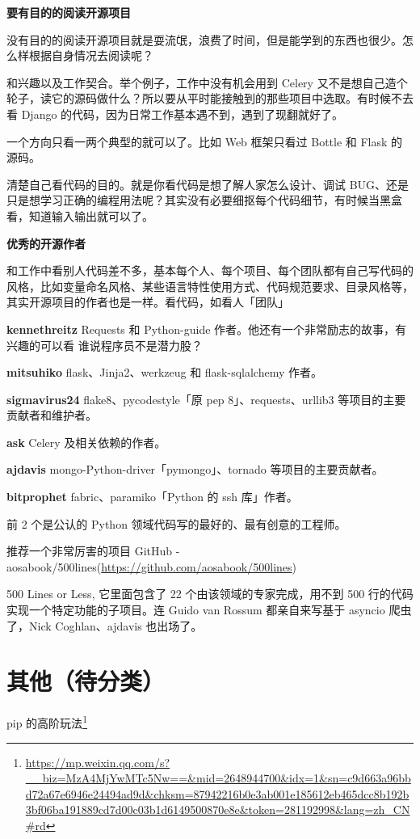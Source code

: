 \documentclass[]{ctexbook}
\renewcommand{\href}[2]{#2\footnote{\url{#1}}}
\begin{document}
\textbf{要有目的的阅读开源项目}

没有目的的阅读开源项目就是耍流氓，浪费了时间，但是能学到的东西也很少。怎么样根据自身情况去阅读呢？

和兴趣以及工作契合。举个例子，工作中没有机会用到 Celery 又不是想自己造个轮子，读它的源码做什么？所以要从平时能接触到的那些项目中选取。有时候不去看 Django 的代码，因为日常工作基本遇不到，遇到了现翻就好了。

一个方向只看一两个典型的就可以了。比如 Web 框架只看过 Bottle 和 Flask 的源码。

清楚自己看代码的目的。就是你看代码是想了解人家怎么设计、调试 BUG、还是只是想学习正确的编程用法呢？其实没有必要细抠每个代码细节，有时候当黑盒看，知道输入输出就可以了。

\textbf{优秀的开源作者}

和工作中看别人代码差不多，基本每个人、每个项目、每个团队都有自己写代码的风格，比如变量命名风格、某些语言特性使用方式、代码规范要求、目录风格等，其实开源项目的作者也是一样。看代码，如看人「团队」

\textbf{kennethreitz} Requests 和 Python-guide 作者。他还有一个非常励志的故事，有兴趣的可以看 谁说程序员不是潜力股？

\textbf{mitsuhiko} flask、Jinja2、werkzeug 和 flask-sqlalchemy 作者。

\textbf{sigmavirus24} flake8、pycodestyle「原 pep 8」、requests、urllib3 等项目的主要贡献者和维护者。

\textbf{ask} Celery 及相关依赖的作者。

\textbf{ajdavis} mongo-Python-driver「pymongo」、tornado 等项目的主要贡献者。

\textbf{bitprophet} fabric、paramiko「Python 的 ssh 库」作者。

前 2 个是公认的 Python 领域代码写的最好的、最有创意的工程师。

推荐一个非常厉害的项目 GitHub - aosabook/500lines(\url{https://github.com/aosabook/500lines})

500 Lines or Less, 它里面包含了 22 个由该领域的专家完成，用不到 500 行的代码实现一个特定功能的子项目。连 Guido van Rossum 都亲自来写基于 asyncio 爬虫了，Nick Coghlan、ajdavis 也出场了。

\hypertarget{ux5176ux4ed6ux5f85ux5206ux7c7b}{%
\section{其他（待分类）}\label{ux5176ux4ed6ux5f85ux5206ux7c7b}}

\href{https://mp.weixin.qq.com/s?__biz=MzA4MjYwMTc5Nw==\&mid=2648944700\&idx=1\&sn=c9d663a96bbd72a67e6946e24494ad9d\&chksm=87942216b0e3ab001e185612eb465dcc8b192b3bf06ba191889cd7d00c03b1d6149500870e8e\&token=281192998\&lang=zh_CN\#rd}{pip 的高阶玩法}
\end{document}
